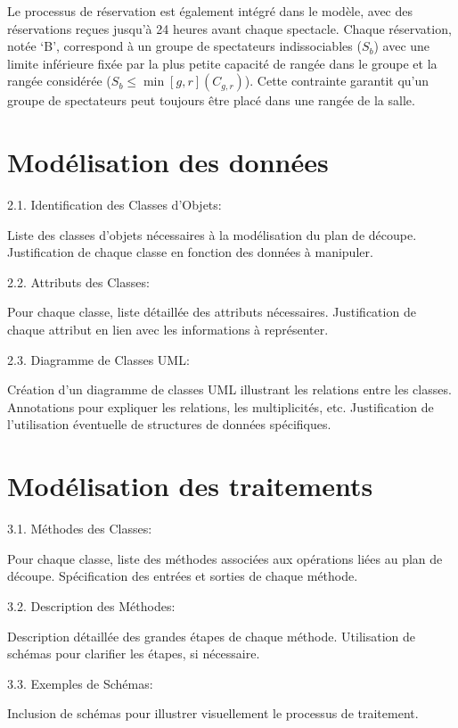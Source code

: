 \documentclass{article}
\begin{document}
Le processus de réservation est également intégré dans le modèle, avec des réservations reçues jusqu'à 24 heures avant chaque spectacle. Chaque réservation, notée `B', correspond à un groupe de spectateurs indissociables (\(S_b\)) avec une limite inférieure fixée par la plus petite capacité de rangée dans le groupe et la rangée considérée (\(S_b \leq \min[g,r](C_{g,r})\)). Cette contrainte garantit qu'un groupe de spectateurs peut toujours être placé dans une rangée de la salle.

\section{Modélisation des données}
2.1. Identification des Classes d'Objets:

    Liste des classes d'objets nécessaires à la modélisation du plan de découpe.
    Justification de chaque classe en fonction des données à manipuler.

2.2. Attributs des Classes:

    Pour chaque classe, liste détaillée des attributs nécessaires.
    Justification de chaque attribut en lien avec les informations à représenter.

2.3. Diagramme de Classes UML:\@

    Création d'un diagramme de classes UML illustrant les relations entre les classes.
    Annotations pour expliquer les relations, les multiplicités, etc.
    Justification de l'utilisation éventuelle de structures de données spécifiques.

\section{Modélisation des traitements}
3.1. Méthodes des Classes:

    Pour chaque classe, liste des méthodes associées aux opérations liées au plan de découpe.
    Spécification des entrées et sorties de chaque méthode.

3.2. Description des Méthodes:

    Description détaillée des grandes étapes de chaque méthode.
    Utilisation de schémas pour clarifier les étapes, si nécessaire.

3.3. Exemples de Schémas:

    Inclusion de schémas pour illustrer visuellement le processus de traitement.
\end{document}

